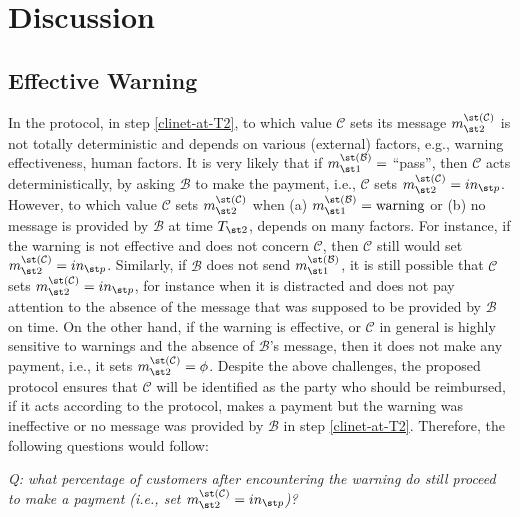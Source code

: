 

\section{Discussion}
 
 
 \subsection{Effective Warning}
In the protocol, in step \ref{clinet-at-T2}, to which value  $\mathcal{C}$ sets its message $m_{\st 2}^{\st(\mathcal C)}$ is not totally deterministic  and depends on various (external) factors, e.g., warning effectiveness,  human factors. It is very  likely that  if $m_{\st 1}^{\st(\mathcal B)}=$ ``pass'', then $\mathcal{C}$ acts deterministically, by asking $\mathcal{B}$ to make the payment, i.e.,  $\mathcal{C}$ sets  $m_{\st 2}^{\st(\mathcal C)}=in_{\st p}$.   However,  to which value $\mathcal{C}$ sets $m_{\st 2}^{\st(\mathcal C)}$ when (a) $m_{\st 1}^{\st(\mathcal B)}= \text{warning}$ or (b) no message is provided by $\mathcal{B}$ at time $T_{\st 2}$, depends on many factors. For instance, if the warning is not effective and does not concern $\mathcal{C}$, then $\mathcal{C}$ still would  set    $m_{\st 2}^{\st(\mathcal C)}=in_{\st p}$. Similarly, if  $\mathcal B$ does not send $m_{\st 1}^{\st(\mathcal B)}$, it is still possible that $\mathcal{C}$ sets $m_{\st 2}^{\st(\mathcal C)}=in_{\st p}$, for instance when it is distracted and does not pay attention to the absence of  the message that was supposed to be provided by $\mathcal{B}$ on time. On the other hand, if the warning is effective, or $\mathcal{C}$ in general is highly sensitive to warnings and  the absence of $\mathcal B$'s message, then it  does not make any payment, i.e.,  it sets $m_{\st 2}^{\st(\mathcal C)}=\phi$. Despite the above challenges, the proposed protocol ensures that $\mathcal{C}$ will be identified as the party who should be reimbursed,  if it acts according to the protocol, makes a payment but the warning was ineffective or no message was provided by $\mathcal{B}$ in step \ref{clinet-at-T2}. Therefore, the following questions would  follow: 


  \begin{center}\textit{Q: what percentage of customers after encountering the warning do still proceed to make a payment (i.e., set $m_{\st 2}^{\st(\mathcal C)}=in_{\st p}$)?}
\end{center}

